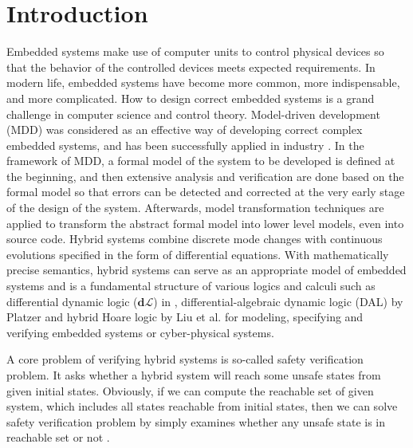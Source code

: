 \documentclass{jssc}
\begin{document}



\section{Introduction}
\label{sec:introduction}
Embedded systems make use of computer units to control physical devices so that the behavior of the controlled devices meets expected requirements. In modern life, embedded systems have become more common, more indispensable, and more complicated. How to design correct embedded systems is a grand challenge in computer science and control theory.
Model-driven development (MDD) was considered as an effective way of developing correct complex embedded systems, and has been successfully applied in industry \cite{Henzinger06,Lee00}. In the framework of MDD, a formal model of the system to be developed is defined at the beginning, and then extensive analysis and verification are done based on the formal model so that errors can be detected and corrected at the very early stage of the design of the system. Afterwards, model transformation techniques are applied to transform the abstract formal model into lower level models, even into source code. Hybrid systems combine discrete mode changes with continuous evolutions specified in the form of differential equations. With mathematically precise semantics, hybrid systems can serve as an appropriate model of embedded systems \cite{MP92,ACHH93,BMS1993,Henzinger96,DN2000,Platzer08DL,Platzer10book} and is a fundamental structure of various logics and calculi such as differential dynamic logic ($\mathbf d \mathcal L$) in \cite{Platzer08DL,Platzer12LICS}, differential-algebraic dynamic logic (DAL) by Platzer \cite{Platzer10} and hybrid Hoare logic by Liu et al. \cite{aplas} for modeling, specifying and verifying embedded systems or cyber-physical systems.

A core problem of verifying hybrid systems is so-called safety verification problem. It asks whether a hybrid system will reach some unsafe states from given initial states. Obviously, if we can compute the reachable set of given system, which includes all states reachable from initial states, then we can solve safety verification problem by simply examines whether any unsafe state is in reachable set or not \cite{clarke2003abstraction}.
\end{document}
